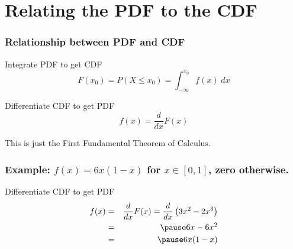 \section{Relating the PDF to the CDF}


\begin{frame}
\frametitle{Relationship between PDF and CDF}

\begin{block}{Integrate PDF to get CDF}
	\[
    F(x_0) = P(X\leq x_0) = \int_{-\infty}^{x_0} f(x)\; dx
  \]
\end{block}

\begin{block}{Differentiate CDF to get PDF}
 	\[
    f(x) =\frac{d}{dx}F(x)
  \]
\end{block}

\alert{This is just the First Fundamental Theorem of Calculus.}
\end{frame}


\begin{frame}
  \frametitle{Example: $f(x) = 6x(1-x)$ for $x \in [0,1]$, zero otherwise.}

  \begin{block}{Differentiate CDF to get PDF}
    \begin{eqnarray*}
      f(x) &=& \frac{d}{dx}F(x) = \frac{d}{dx} \left( 3x^2 - 2x^3 \right)\\
      &=& \pause 6x - 6x^2\\
      &=& \pause 6x(1 - x)
    \end{eqnarray*}
  \end{block}
\end{frame}
